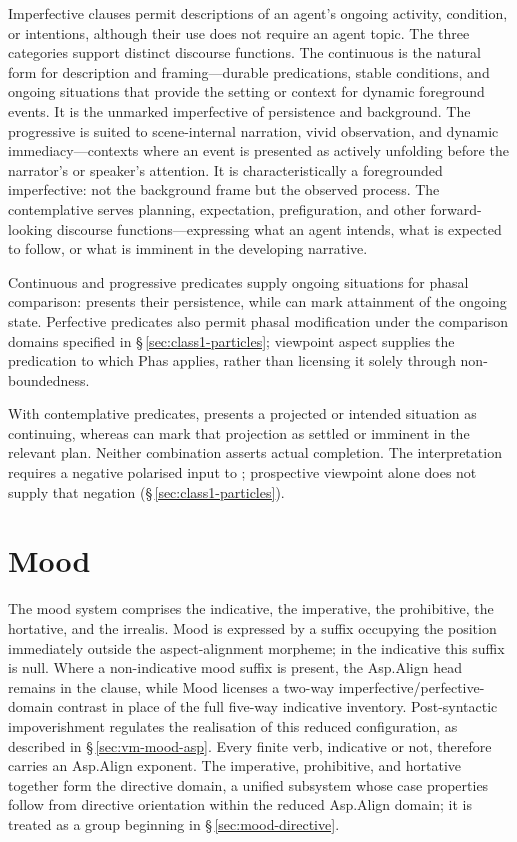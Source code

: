 Imperfective clauses permit descriptions of an agent's ongoing activity,
condition, or intentions, although their use does not require an agent topic.
The three categories support distinct discourse functions. The continuous is the natural form for description and
framing---durable predications, stable conditions, and ongoing situations that
provide the setting or context for dynamic foreground events. It is the unmarked
imperfective of persistence and background. The progressive is suited to
scene-internal narration, vivid observation, and dynamic immediacy---contexts
where an event is presented as actively unfolding before the narrator's or
speaker's attention. It is characteristically a foregrounded imperfective: not
the background frame but the observed process. The contemplative serves
planning, expectation, prefiguration, and other forward-looking discourse
functions---expressing what an agent intends, what is expected to follow, or
what is imminent in the developing narrative.

Continuous and progressive predicates supply ongoing situations for phasal
comparison:  presents their persistence, while  can mark
attainment of the ongoing state. Perfective predicates also permit phasal
modification under the comparison domains specified in
§\,\ref{sec:class1-particles}; viewpoint aspect supplies the predication
to which Phas applies, rather than licensing it solely through
non-boundedness.

With contemplative predicates,  presents a projected or intended
situation as continuing, whereas  can mark that projection as
settled or imminent in the relevant plan. Neither combination asserts actual
completion. The  interpretation requires a negative polarised
input to ; prospective viewpoint alone does not supply that negation
(§\,\ref{sec:class1-particles}).

\section{Mood}\label{sec:mood}

The mood system comprises the indicative, the imperative, the prohibitive, the
hortative, and the irrealis. Mood is expressed by a suffix occupying the
position immediately outside the aspect-alignment morpheme; in the indicative
this suffix is null. Where a non-indicative mood suffix is present, the
Asp.Align head remains in the clause, while Mood licenses a two-way
imperfective/perfective-domain contrast in place of the full five-way
indicative inventory. Post-syntactic impoverishment regulates the realisation
of this reduced configuration, as described in
§\,\ref{sec:vm-mood-asp}. Every finite verb, indicative or not, therefore
carries an Asp.Align exponent. The imperative, prohibitive, and hortative
together form the directive domain, a unified subsystem whose case properties
follow from directive orientation within the reduced Asp.Align domain;
it is treated as a group beginning in §\,\ref{sec:mood-directive}.

